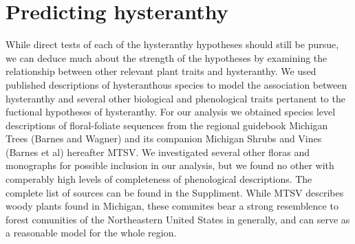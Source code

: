 \documentclass{article}\usepackage[]{graphicx}\usepackage[]{color}
\begin{document}
\section*{Predicting hysteranthy}
While direct tests of each of the hysteranthy hypotheses should still be pursue, we can deduce much about the strength of the hypotheses by examining the relationship between other relevant plant traits and hysteranthy. We used published descriptions of hysteranthous species to model the association between hysteranthy and several other biological and phenological traits pertanent to the fuctional hypotheses of hysteranthy.
For our analysis we obtained species level descriptions of floral-foliate sequences from the regional guidebook Michigan Trees (Barnes and Wagner) and its companion Michigan Shrubs and Vines (Barnes et al) hereafter MTSV. We investigated several other floras and monographs for possible inclusion in our analysis, but we found no other with comperably high levels of completeness of phenological descriptions. The complete list of sources can be found in the Suppliment. While MTSV describes woody plants found in Michigan, these comunites bear a strong resemblence to forest comunities of the Northeastern United States in generally, and can serve as a reasonable model for the whole region. \\
\end{document}
